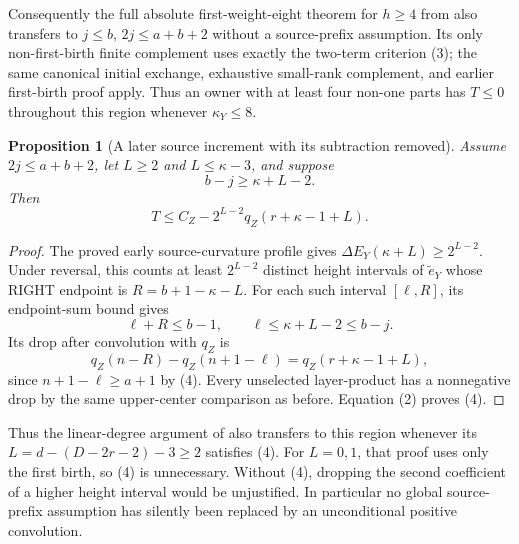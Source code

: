 \documentclass[11pt]{article}
\newtheorem{proposition}{Proposition}[section]
\begin{document}
Consequently the full absolute first-weight-eight theorem for
$h\ge4$ from {\normalfont{}} also
transfers to $j\le b$, $2j\le a+b+2$ without a source-prefix
assumption. Its only non-first-birth finite complement uses exactly
the two-term criterion (3); the same canonical initial exchange,
exhaustive small-rank complement, and earlier first-birth proof apply.
Thus an owner with at least four non-one parts has $T\le0$
throughout this region whenever $\kappa_Y\le8$.

\begin{proposition}[A later source increment with its subtraction removed]
Assume $2j\le a+b+2$, let $L\ge2$ and $L\le\kappa-3$, and suppose
\[
                       b-j\ge\kappa+L-2.            \tag{4}
\]
Then
\[
 \boxed{T\le C_Z-2^{L-2}q_Z(r+\kappa-1+L).}         \tag{5}
\]
\end{proposition}
\begin{proof}
The proved early source-curvature profile gives
$\Delta E_Y(\kappa+L)\ge2^{L-2}$.
Under reversal, this counts at least $2^{L-2}$ distinct
height intervals of $\widetilde e_Y$ whose RIGHT endpoint is
$R=b+1-\kappa-L$. For each such interval $[\ell,R]$,
its endpoint-sum bound gives
\[
 \ell+R\le b-1,\qquad \ell\le\kappa+L-2\le b-j.
\]
Its drop after convolution with $q_Z$ is
\[
 q_Z(n-R)-q_Z(n+1-\ell)
    =q_Z(r+\kappa-1+L),
\]
since $n+1-\ell\ge a+1$ by (4). Every unselected
layer-product has a nonnegative drop by the same upper-center
comparison as before. Equation (2) proves (4).
\end{proof}

Thus the linear-degree argument of
{\normalfont{}} also transfers
to this region whenever its $L=d-(D-2r-2)-3\ge2$ satisfies (4).
For $L=0,1$, that proof uses only the first birth, so (4) is unnecessary.
Without (4), dropping the second coefficient of a higher height interval
would be unjustified. In particular no global source-prefix assumption
has silently been replaced by an unconditional positive convolution.
\end{document}
